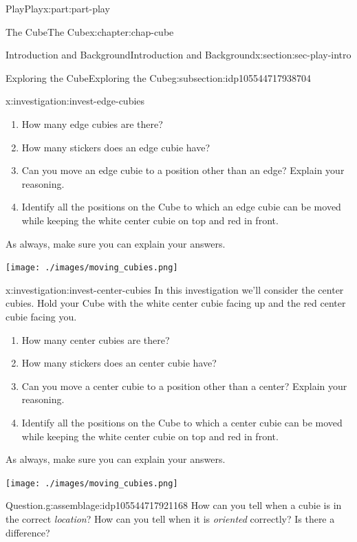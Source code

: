 \documentclass[oneside,10pt,]{book}
\numberwithin{equation}{section}
\begin{document}
\begin{partptx}{Play}{}{Play}{}{}{x:part:part-play}
\begin{chapterptx}{The Cube}{}{The Cube}{}{}{x:chapter:chap-cube}
\begin{sectionptx}{Introduction and Background}{}{Introduction and Background}{}{}{x:section:sec-play-intro}
\begin{subsectionptx}{Exploring the Cube}{}{Exploring the Cube}{}{}{g:subsection:idp105544717938704}
\begin{investigation}{}{x:investigation:invest-edge-cubies}
\begin{enumerate}
\item{}How many edge cubies are there?%
\item{}How many stickers does an edge cubie have?%
\item{}Can you move an edge cubie to a position other than an edge? Explain your reasoning.%
\item{}Identify all the positions on the Cube to which an edge cubie can be moved while keeping the white center cubie on top and red in front.%
\end{enumerate}
As always, make sure you can explain your answers.%
\begin{image}{0.25}{0.5}{0.25}%
\texttt{[image: ./images/moving\_cubies.png]}
\end{image}%
\end{investigation}%
\begin{investigation}{}{x:investigation:invest-center-cubies}%
In this investigation we'll consider the center cubies. Hold your Cube with the white center cubie facing up and the red center cubie facing you.%
\begin{enumerate}
\item{}How many center cubies are there?%
\item{}How many stickers does an center cubie have?%
\item{}Can you move a center cubie to a position other than a center? Explain your reasoning.%
\item{}Identify all the positions on the Cube to which a center cubie can be moved while keeping the white center cubie on top and red in front.%
\end{enumerate}
As always, make sure you can explain your answers.%
\begin{image}{0.25}{0.5}{0.25}%
\texttt{[image: ./images/moving\_cubies.png]}
\end{image}%
\end{investigation}%
\begin{assemblage}{Question.}{g:assemblage:idp105544717921168}%
How can you tell when a cubie is in the correct \emph{location}? How can you tell when it is \emph{oriented} correctly? Is there a difference?\footnotemark{}%
\end{assemblage}
%
\end{subsectionptx}
\end{sectionptx}
%
%
\typeout{************************************************}

\end{chapterptx}
\end{partptx}
\end{document}
